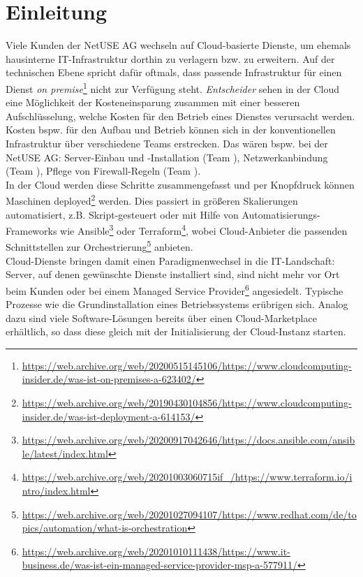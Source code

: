\chapter{Einleitung}

Viele Kunden der NetUSE AG wechseln auf Cloud-basierte Dienste, um ehemals hausinterne IT-Infrastruktur dorthin zu verlagern bzw. zu erweitern. Auf der technischen Ebene spricht dafür oftmals, dass passende Infrastruktur für einen Dienst \textit{on premise}\footnote{\url{https://web.archive.org/web/20200515145106/https://www.cloudcomputing-insider.de/was-ist-on-premises-a-623402/}} nicht zur Verfügung steht. \textit{Entscheider} sehen in der Cloud eine Möglichkeit der Kosteneinsparung zusammen mit einer besseren Aufschlüsselung, welche Kosten für den Betrieb eines Dienstes verursacht werden. Kosten bspw. für den Aufbau und Betrieb können sich in der konventionellen Infrastruktur über verschiedene Teams erstrecken. Das wären bspw. bei der NetUSE AG: Server-Einbau und -Installation (Team \grqq{}), Netzwerkanbindung (Team \grqq{}), Pflege von Firewall-Regeln (Team \grqq{}).\\
In der Cloud werden diese Schritte zusammengefasst und per Knopfdruck können Maschinen deployed\footnote{\url{https://web.archive.org/web/20190430104856/https://www.cloudcomputing-insider.de/was-ist-deployment-a-614153/}} werden. Dies passiert in größeren Skalierungen automatisiert, z.B. Skript-gesteuert oder mit Hilfe von Automatisierungs-Frameworks wie Ansible\footnote{\url{https://web.archive.org/web/20200917042646/https://docs.ansible.com/ansible/latest/index.html}} oder Terraform\footnote{\url{https://web.archive.org/web/20201003060715if\_/https://www.terraform.io/intro/index.html}}, wobei Cloud-Anbieter die passenden Schnittstellen zur Orchestrierung\footnote{\url{https://web.archive.org/web/20201027094107/https://www.redhat.com/de/topics/automation/what-is-orchestration}} anbieten.\\
Cloud-Dienste bringen damit einen Paradigmenwechsel in die IT-Landschaft: Server, auf denen gewünschte Dienste installiert sind, sind nicht mehr vor Ort beim Kunden oder bei einem Managed Service Provider\footnote{\url{https://web.archive.org/web/20201010111438/https://www.it-business.de/was-ist-ein-managed-service-provider-msp-a-577911/}} angesiedelt. Typische Prozesse wie die Grundinstallation eines Betriebssystems erübrigen sich. Analog dazu sind viele Software-Lösungen bereits über einen Cloud-Marketplace erhältlich, so dass diese gleich mit der Initialisierung der Cloud-Instanz starten.\\
